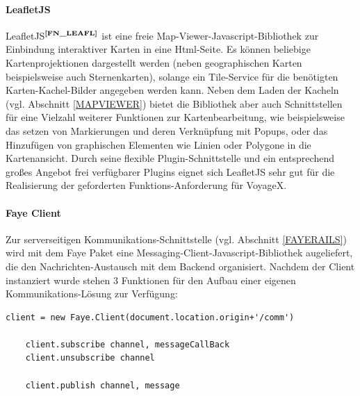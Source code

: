 \paragraph{LeafletJS}
{LeafletJS$^{\textbf{\ref{FN_LEAFL}}}$}\label{LEAFL}
ist eine freie Map-Viewer-Javascript-Bibliothek zur Einbindung interaktiver Karten in eine Html-Seite.
Es können beliebige Kartenprojektionen dargestellt werden (neben geographischen Karten beispielsweise auch Sternenkarten), solange ein Tile-Service für die benötigten Karten-Kachel-Bilder angegeben werden kann.
Neben dem Laden der Kacheln (vgl. Abschnitt \ref{MAPVIEWER}) bietet die Bibliothek aber auch Schnittstellen für eine Vielzahl weiterer Funktionen zur Kartenbearbeitung, wie beispielsweise das setzen von Markierungen und deren Verknüpfung mit Popups, oder das Hinzufügen von graphischen Elementen wie Linien oder Polygone in die Kartenansicht. 
Durch seine flexible Plugin-Schnittstelle und ein entsprechend großes Angebot frei verfügbarer Plugins eignet sich LeafletJS sehr gut für die Realisierung der geforderten Funktions-Anforderung für VoyageX.

\paragraph{Faye Client}
Zur serverseitigen Kommunikations-Schnittstelle (vgl. Abschnitt \ref{FAYERAILS}) wird mit dem Faye Paket
eine Messaging-Client-Javascript-Bibliothek augeliefert, die den Nachrichten-Austausch mit dem Backend organisiert. Nachdem der Client instanziert wurde stehen 3 Funktionen für den Aufbau einer eigenen Kommunikations-Lösung zur Verfügung:\\
\lstset{language=JavaScript}
\begin{lstlisting}[frame=single,numbers=none,xleftmargin=0pt,caption={API des Faye-Clients},captionpos=b]
    client = new Faye.Client(document.location.origin+'/comm')

    client.subscribe channel, messageCallBack
    client.unsubscribe channel

    client.publish channel, message
\end{lstlisting}

